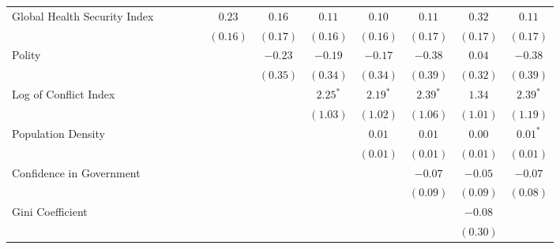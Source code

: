 \documentclass[
  11pt,
]{article}
\begin{document}
\begin{table}
\begin{center}
\begin{small}
\begin{tabular}{l c c c c c c c c c c c}
Global Health Security Index &             &            &            &              & $0.23$       & $0.16$       & $0.11$       & $0.10$       & $0.11$       & $0.32$      & $0.11$        \\
                             &             &            &            &              & $(0.16)$     & $(0.17)$     & $(0.16)$     & $(0.16)$     & $(0.17)$     & $(0.17)$    & $(0.17)$      \\
Polity                       &             &            &            &              &              & $-0.23$      & $-0.19$      & $-0.17$      & $-0.38$      & $0.04$      & $-0.38$       \\
                             &             &            &            &              &              & $(0.35)$     & $(0.34)$     & $(0.34)$     & $(0.39)$     & $(0.32)$    & $(0.39)$      \\
Log of Conflict Index        &             &            &            &              &              &              & $2.25^{*}$   & $2.19^{*}$   & $2.39^{*}$   & $1.34$      & $2.39^{*}$    \\
                             &             &            &            &              &              &              & $(1.03)$     & $(1.02)$     & $(1.06)$     & $(1.01)$    & $(1.19)$      \\
Population Density           &             &            &            &              &              &              &              & $0.01$       & $0.01$       & $0.00$      & $0.01^{*}$    \\
                             &             &            &            &              &              &              &              & $(0.01)$     & $(0.01)$     & $(0.01)$    & $(0.01)$      \\
Confidence in Government     &             &            &            &              &              &              &              &              & $-0.07$      & $-0.05$     & $-0.07$       \\
                             &             &            &            &              &              &              &              &              & $(0.09)$     & $(0.09)$    & $(0.08)$      \\
Gini Coefficient             &             &            &            &              &              &              &              &              &              & $-0.08$     &               \\
                             &             &            &            &              &              &              &              &              &              & $(0.30)$    &               \\

\end{tabular}
\end{small}
\end{center}
\end{table}
\end{document}

